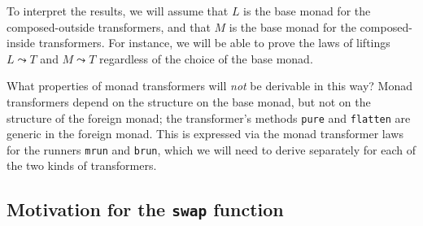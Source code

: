 To interpret the results, we will assume that $L$ is the base monad
for the composed-outside transformers, and that $M$ is the base monad
for the composed-inside transformers. For instance, we will be able
to prove the laws of liftings $L\leadsto T$ and $M\leadsto T$ regardless
of the choice of the base monad.

What properties of monad transformers will \emph{not} be derivable
in this way? Monad transformers depend on the structure on the base
monad, but not on the structure of the foreign monad; the transformer's
methods \lstinline!pure!
and \lstinline!flatten!
are generic in the foreign monad. This is expressed via the monad
transformer laws for the runners \lstinline!mrun!
and \lstinline!brun!, which
we will need to derive separately for each of the two kinds of transformers.

\subsection{Motivation for the \texttt{swap} function}

